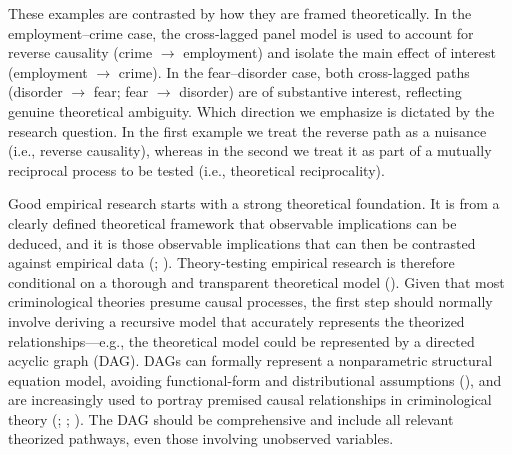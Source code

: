\documentclass[
  letterpaper,
  DIV=11,
  numbers=noendperiod]{scrartcl}
\begin{document}
These examples are contrasted by how they are framed theoretically. In
the employment--crime case, the cross‐lagged panel model is used to
account for reverse causality (crime \(\rightarrow\) employment) and
isolate the main effect of interest (employment \(\rightarrow\) crime).
In the fear--disorder case, both cross-lagged paths (disorder
\(\rightarrow\) fear; fear \(\rightarrow\) disorder) are of substantive
interest, reflecting genuine theoretical ambiguity. Which direction we
emphasize is dictated by the research question. In the first example we
treat the reverse path as a nuisance (i.e., reverse causality), whereas
in the second we treat it as part of a mutually reciprocal process to be
tested (i.e., theoretical reciprocality).

Good empirical research starts with a strong theoretical foundation. It
is from a clearly defined theoretical framework that observable
implications can be deduced, and it is those observable implications
that can then be contrasted against empirical data
(;
). Theory-testing empirical
research is therefore conditional on a thorough and transparent
theoretical model (). Given that most criminological theories presume causal
processes, the first step should normally involve deriving a recursive
model that accurately represents the theorized relationships---e.g., the
theoretical model could be represented by a directed acyclic graph
(DAG). DAGs can formally represent a nonparametric structural equation
model, avoiding functional-form and distributional assumptions
(), and are increasingly
used to portray premised causal relationships in criminological theory
(;
;
). The DAG
should be comprehensive and include all relevant theorized pathways,
even those involving unobserved variables.
\end{document}

